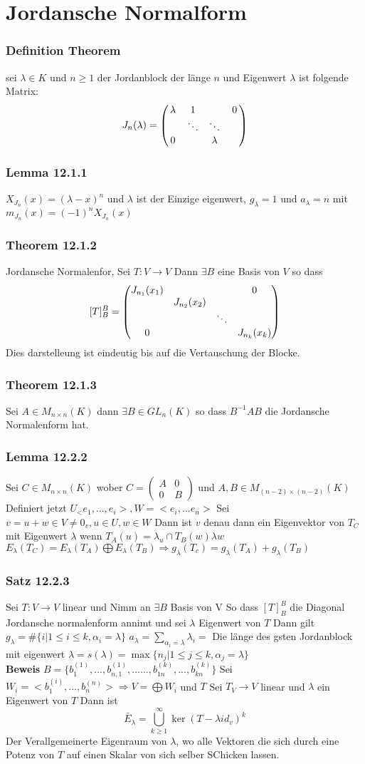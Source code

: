 \documentclass{article}
\newcommand{\smspc}{\hspace{0.3cm}}
\newcommand{\satz}[1]{\subsubsection*{Satz {#1}}}
\newcommand{\beweis}{\\\textbf{Beweis }}
\newcommand{\theorem}[1]{\subsubsection*{Theorem {#1}}}
\newcommand{\lemma}[1]{\subsubsection*{Lemma {#1}}}
\newcommand{\definition}[1]{\subsubsection*{Definition {#1}}}
\begin{document}
\section*{Jordansche Normalform} \definition{ Theorem} sei $\lambda\in K$ und $n\ge1$ der Jordanblock der länge $n$ und Eigenwert $\lambda$ ist folgende Matrix:\[J_n(\lambda)=\begin{pmatrix}\lambda&1&\smspc&0\\\smspc&\ddots&\ddots&\smspc\\0&\smspc&\lambda\end{pmatrix}\]
\lemma{12.1.1} $X_{J_n}(x)=(\lambda-x)^n$ und $\lambda$ ist der Einzige eigenwert, $g_\lambda=1$ und $a_\lambda=n$ mit $m_{J_n}(x)=(-1)^nX_{J_n}(x)$ 
\theorem{12.1.2} Jordansche Normalenfor, Sei $T:V\rightarrow V$ Dann $\exists B$ eine Basis von $V$ so dass 
\[[T]^B_B=\begin{pmatrix}J_{n_1}(x_1)&\smspc&\smspc&0\\\smspc&J_{n_2}(x_2)&\smspc&\smspc\\\smspc&\smspc&\ddots&\smspc\\0&\smspc&\smspc&J_{n_k}(x_k)\end{pmatrix}\]
Dies darstelleung ist eindeutig bis auf die Vertauschung der Blocke. 
\theorem{12.1.3} Sei $A\in M_{n\times n} (K)$ dann $\exists B\in GL_n(K)$ so dass $B^{-1}AB$ die Jordansche Normalenform hat.
\lemma{12.2.2} Sei $C\in M_{n\times n}(K)$ wober $C=\begin{pmatrix}A&0\\0&B\end{pmatrix}$ und $A,B\in M_{(n-2)\times (n-2)}(K)$ Definiert jetzt $U_<e_1,...,e_i>,W=<e_i,...e_n>$ 
Sei $v=u+w\in V\neq0_v,u\in U,w\in W$ Dann ist $v$ denau dann ein Eigenvektor von $T_C$ mit Eigenwert $\lambda$ wenn $T_A(u)=\lambda_u \cap T_B(w)\lambda w$ 
$E_\lambda (T_C)=E_\lambda(T_A)\bigoplus E_\lambda(T_B)\Rightarrow g_\lambda(T_c)=g_\lambda(T_A)+g_\lambda(T_B)$
\satz{12.2.3} Sei $T:V\rightarrow V$ linear und Nimm an $\exists B$ Basis von V So dass $[T]^B_B$ die Diagonal Jordansche normalenform annimt und sei $\lambda$ Eigenwert von $T$ Dann gilt $g_\lambda=\#\lbrace i|1\le i\le k, \alpha_i=\lambda\rbrace$
$a_\lambda=\sum_{\alpha_i=\lambda}\lambda_i=$ Die länge des gsten Jordanblock mit eigenwert $\lambda =s(\lambda)=\max\lbrace n_j|1\le j\le k, \alpha_j=\lambda\rbrace$
\beweis $B=\lbrace b_1^{(1)},...,b_{n,1}^{(1)}, ...... ,b_{1n}^{(k)},...,b_{kn}^{(k)}\rbrace$
Sei $W_i=<b_1^{(i)},...,b_n^{(n)}>\Rightarrow V=\bigoplus W_i$ und $T$ 
 Sei $T_V\rightarrow V$ linear und $\lambda$ ein Eigenwert von $T$ Dann ist \[\tilde{E_\lambda}=\bigcup_{k\ge1}^{\infty}\ker(T-\lambda id_v)^k\] Der Verallgemeinerte Eigenraum von $\lambda$, wo alle Vektoren die sich durch eine Potenz von $T$ auf einen Skalar von sich selber SChicken lassen.
\end{document}
